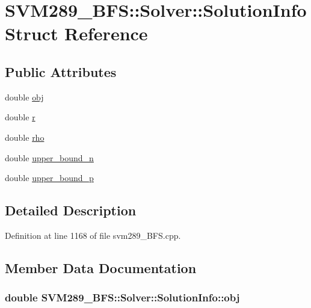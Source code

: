 \hypertarget{struct_s_v_m289___b_f_s_1_1_solver_1_1_solution_info}{}\section{S\+V\+M289\+\_\+\+B\+FS\+:\+:Solver\+:\+:Solution\+Info Struct Reference}
\label{struct_s_v_m289___b_f_s_1_1_solver_1_1_solution_info}
\subsection*{Public Attributes}
\begin{DoxyCompactItemize}
\item 
double \hyperlink{struct_s_v_m289___b_f_s_1_1_solver_1_1_solution_info_a5051c01a5c1eefc3e38c963848295e74}{obj}
\item 
double \hyperlink{struct_s_v_m289___b_f_s_1_1_solver_1_1_solution_info_af4d162d0a9f9f2d50dfac40e4fa0652d}{r}
\item 
double \hyperlink{struct_s_v_m289___b_f_s_1_1_solver_1_1_solution_info_a60d5d2cf39ad707039e0ef4a0cb7ba2d}{rho}
\item 
double \hyperlink{struct_s_v_m289___b_f_s_1_1_solver_1_1_solution_info_aacda21688b31ff854b0e17ae458f6d42}{upper\+\_\+bound\+\_\+n}
\item 
double \hyperlink{struct_s_v_m289___b_f_s_1_1_solver_1_1_solution_info_a06cbde68d648800d92969dd4509050fe}{upper\+\_\+bound\+\_\+p}
\end{DoxyCompactItemize}


\subsection{Detailed Description}


Definition at line 1168 of file svm289\+\_\+\+B\+F\+S.\+cpp.



\subsection{Member Data Documentation}
\subsubsection[{\texorpdfstring{obj}{obj}}]{\setlength{\rightskip}{0pt plus 5cm}double S\+V\+M289\+\_\+\+B\+F\+S\+::\+Solver\+::\+Solution\+Info\+::obj}\hypertarget{struct_s_v_m289___b_f_s_1_1_solver_1_1_solution_info_a5051c01a5c1eefc3e38c963848295e74}{}\label{struct_s_v_m289___b_f_s_1_1_solver_1_1_solution_info_a5051c01a5c1eefc3e38c963848295e74}


